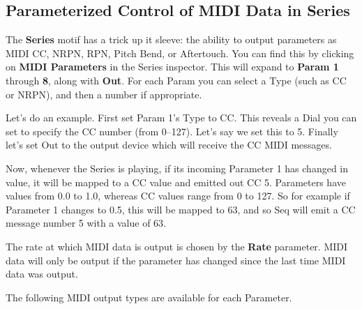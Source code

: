 \documentclass[twoside,10pt]{article}
\begin{document}
\subsection{Parameterized Control of MIDI Data in Series}
\label{mididata}

The {\bf Series} motif has a trick up it sleeve: the ability to output parameters as MIDI CC, NRPN, RPN, Pitch Bend, or Aftertouch. You can find this by clicking on {\bf MIDI Parameters} in the Series inspector.  This will expand to {\bf Param 1} through {\bf 8}, along with {\bf Out}.  For each Param you can select a Type (such as CC or NRPN), and then a number if appropriate.  

Let's do an example.  First set Param 1's Type to CC.  This reveals a Dial you can set to specify the CC number (from 0--127).  Let's say we set this to 5.  Finally let's set Out to the output device which will receive the CC MIDI messages.

Now, whenever the Series is playing, if its incoming Parameter 1 has changed in value, it will be mapped to a CC value and emitted out CC 5.  Parameters have values from 0.0 to 1.0, whereas CC values range from 0 to 127.  So for example if Parameter 1 changes to 0.5, this will be mapped to 63, and so Seq will emit a CC message number 5 with a value of 63.

The rate at which MIDI data is output is chosen by the {\bf Rate} parameter.  MIDI data will only be output if the parameter has changed since the last time MIDI data was output.

The following MIDI output types are available for each Parameter.
\end{document}
